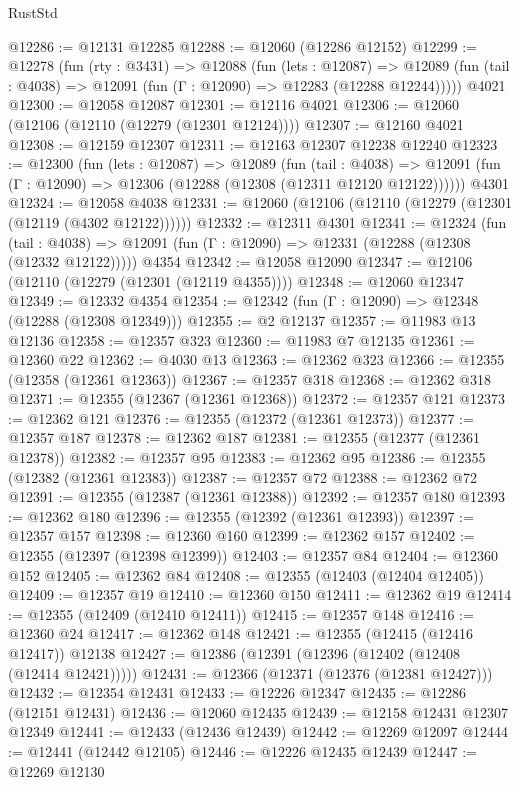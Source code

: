 \begin{lexlean}{RustStd}
\begin{coremodule}
@12286 := @12131 @12285
@12288 := @12060 (@12286 @12152)
@12299 := @12278
    (fun (rty : @3431) =>
    @12088
      (fun (lets : @12087) =>
      @12089 (fun (tail : @4038) => @12091 (fun (Γ : @12090) => @12283 (@12288 @12244)))))
    @4021
@12300 := @12058 @12087
@12301 := @12116 @4021
@12306 := @12060 (@12106 (@12110 (@12279 (@12301 @12124))))
@12307 := @12160 @4021
@12308 := @12159 @12307
@12311 := @12163 @12307 @12238 @12240
@12323 := @12300
    (fun (lets : @12087) =>
    @12089
      (fun (tail : @4038) =>
      @12091 (fun (Γ : @12090) => @12306 (@12288 (@12308 (@12311 @12120 @12122))))))
    @4301
@12324 := @12058 @4038
@12331 := @12060 (@12106 (@12110 (@12279 (@12301 (@12119 (@4302 @12122))))))
@12332 := @12311 @4301
@12341 := @12324
    (fun (tail : @4038) => @12091 (fun (Γ : @12090) => @12331 (@12288 (@12308 (@12332 @12122)))))
    @4354
@12342 := @12058 @12090
@12347 := @12106 (@12110 (@12279 (@12301 (@12119 @4355))))
@12348 := @12060 @12347
@12349 := @12332 @4354
@12354 := @12342 (fun (Γ : @12090) => @12348 (@12288 (@12308 @12349)))
@12355 := @2 @12137
@12357 := @11983 @13 @12136
@12358 := @12357 @323
@12360 := @11983 @7 @12135
@12361 := @12360 @22
@12362 := @4030 @13
@12363 := @12362 @323
@12366 := @12355 (@12358 (@12361 @12363))
@12367 := @12357 @318
@12368 := @12362 @318
@12371 := @12355 (@12367 (@12361 @12368))
@12372 := @12357 @121
@12373 := @12362 @121
@12376 := @12355 (@12372 (@12361 @12373))
@12377 := @12357 @187
@12378 := @12362 @187
@12381 := @12355 (@12377 (@12361 @12378))
@12382 := @12357 @95
@12383 := @12362 @95
@12386 := @12355 (@12382 (@12361 @12383))
@12387 := @12357 @72
@12388 := @12362 @72
@12391 := @12355 (@12387 (@12361 @12388))
@12392 := @12357 @180
@12393 := @12362 @180
@12396 := @12355 (@12392 (@12361 @12393))
@12397 := @12357 @157
@12398 := @12360 @160
@12399 := @12362 @157
@12402 := @12355 (@12397 (@12398 @12399))
@12403 := @12357 @84
@12404 := @12360 @152
@12405 := @12362 @84
@12408 := @12355 (@12403 (@12404 @12405))
@12409 := @12357 @19
@12410 := @12360 @150
@12411 := @12362 @19
@12414 := @12355 (@12409 (@12410 @12411))
@12415 := @12357 @148
@12416 := @12360 @24
@12417 := @12362 @148
@12421 := @12355 (@12415 (@12416 @12417)) @12138
@12427 := @12386 (@12391 (@12396 (@12402 (@12408 (@12414 @12421)))))
@12431 := @12366 (@12371 (@12376 (@12381 @12427)))
@12432 := @12354 @12431
@12433 := @12226 @12347
@12435 := @12286 (@12151 @12431)
@12436 := @12060 @12435
@12439 := @12158 @12431 @12307 @12349
@12441 := @12433 (@12436 @12439)
@12442 := @12269 @12097
@12444 := @12441 (@12442 @12105)
@12446 := @12226 @12435 @12439
@12447 := @12269 @12130

\end{coremodule}
\end{lexlean}
